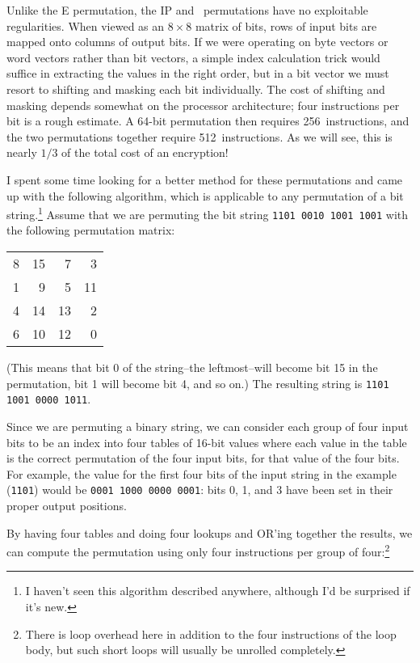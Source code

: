 Unlike the E permutation, the IP and \ipinv\ permutations have no
exploitable regularities.  When viewed as an $8 \times 8$ matrix of
bits, rows of input bits are mapped onto columns of output bits.  If we
were operating on byte vectors or word vectors rather than bit vectors,
a simple index calculation trick would suffice in extracting the values
in the right order, but in a bit vector we must resort to shifting and
masking each bit individually.  The cost of shifting and masking depends
somewhat on the processor architecture; four instructions per bit is a
rough estimate.  A 64-bit permutation then requires 256~instructions,
and the two permutations together require 512~instructions.  As we will
see, this is nearly $1/3$ of the total cost of an encryption!

I spent some time looking for a better method for these permutations
and came up with the following algorithm, which is applicable to any
permutation of a bit string.\footnote{I haven't seen this
algorithm described anywhere, although I'd be surprised if it's new.}
Assume that we are permuting the bit string \verb+1101 0010 1001 1001+ 
with the following permutation matrix:

\begin{center}
\begin{tabular}{r r r r}
   8 & 15 &  7 &  3 \\
   1 &  9 &  5 & 11 \\
   4 & 14 & 13 &  2 \\
   6 & 10 & 12 &  0 \\
\end{tabular}
\end{center}

(This means that bit 0 of the string--the leftmost--will become
bit 15 in the permutation, bit 1 will become bit 4, and so on.)  The
resulting string is \verb+1101 1001 0000 1011+.

Since we are permuting a binary string, we can consider each group of
four input bits to be an index into four tables of 16-bit values where
each value in the table is the correct permutation of the four input
bits, for that value of the four bits.  For example, the value for the
first four bits of the input string in the example (\verb+1101+) would
be \verb+0001 1000 0000 0001+: bits 0, 1, and 3 have been set in their
proper output positions.

By having four tables and doing four lookups and OR'ing together the
results, we can compute the permutation using only four instructions per
group of four:\footnote{There is loop overhead here in addition to the
four instructions of the loop body, but such short loops will usually be
unrolled completely.}

